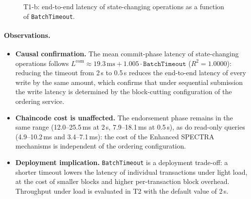 \begin{figure}[H]
\centering
{}
\caption{T1-b: end-to-end latency of state-changing operations as a function of \texttt{BatchTimeout}.}
\label{fig:t1b}
\end{figure}

\paragraph{Observations.}
\begin{itemize}
  \item \textbf{Causal confirmation.} The mean commit-phase latency of state-changing operations follows
        $L^{\mathrm{com}} \approx 19.3\,\mathrm{ms} + 1.005 \cdot \texttt{BatchTimeout}$
        ($R^2 = 1.0000$): reducing the timeout from 2\,s to 0.5\,s reduces the end-to-end latency of
        every write by the same amount, which confirms that under sequential submission the write latency is
        determined by the block-cutting configuration of the ordering service.
  \item \textbf{Chaincode cost is unaffected.} The endorsement phase remains in the same range
        (12.0--25.5\,ms at 2\,s, 7.9--18.1\,ms at 0.5\,s), as do read-only queries
        (4.9--10.2\,ms and 3.4--7.1\,ms): the cost of the Enhanced SPECTRA mechanisms is
        independent of the ordering configuration.
  \item \textbf{Deployment implication.} \texttt{BatchTimeout} is a deployment trade-off: a shorter timeout lowers
        the latency of individual transactions under light load, at the cost of smaller blocks and higher
        per-transaction block overhead. Throughput under load is evaluated in T2 with the default value of 2\,s.
\end{itemize}
